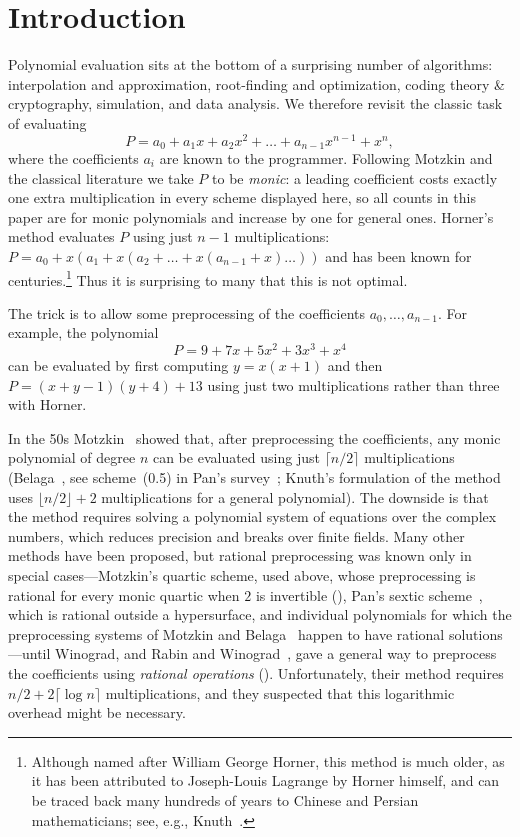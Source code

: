 \section{Introduction}

Polynomial evaluation sits at the bottom of a surprising number of algorithms:
interpolation and approximation,
root-finding and optimization,
coding theory \& cryptography,
simulation, and data analysis.
We therefore revisit the classic task of evaluating
\[
   P = a_0 + a_1 x + a_2 x^2 + \dots + a_{n-1} x^{n-1} + x^{n},
\]
where the coefficients $a_i$ are known to the programmer.
Following Motzkin and the classical literature we take $P$ to be \emph{monic}: a
leading coefficient costs exactly one extra multiplication in every scheme
displayed here, so all counts in this paper are for monic polynomials and
increase by one for general ones.
Horner's method evaluates $P$ using just $n-1$ multiplications:
$P = a_0 + x(a_1 + x(a_2 + \dots + x(a_{n-1} + x)\dots))$ and has been known for centuries.\footnote{Although named after William George Horner, this method is much older, as it has been attributed to Joseph-Louis Lagrange by Horner himself, and can be traced back many hundreds of years to Chinese and Persian mathematicians; see, e.g., Knuth~\cite[\S4.6.4]{knuth1997seminumerical}.}
Thus it is surprising to many that this is not optimal.

The trick is to allow some preprocessing of the coefficients $a_0, \dots, a_{n-1}$.
For example, the polynomial
\[
P = 9 + 7 x + 5 x^2 + 3 x^3 + x^4
\] can be evaluated by first computing
$y = x (x + 1)$ and then $P = (x + y - 1)(y + 4) + 13$ using just two multiplications rather than three with Horner.

In the 50s Motzkin~\cite{motzkin1955evaluation} showed that, after preprocessing the coefficients, any monic polynomial of degree $n$ can be evaluated using just $\lceil n/2\rceil$ multiplications (Belaga~\cite{belaga1958some}, see scheme~(0.5) in Pan's survey~\cite{pan1966methods}; Knuth's formulation of the method~\cite{knuth1997seminumerical} uses $\lfloor n/2\rfloor+2$ multiplications for a general polynomial).
The downside is that the method requires solving a polynomial system of equations over the complex numbers, which reduces precision and breaks over finite fields.
Many other methods have been proposed, but rational preprocessing was known only in special cases---Motzkin's quartic scheme, used above, whose preprocessing is rational for every monic quartic when $2$ is invertible (), Pan's sextic scheme~\cite{pan1961schemes}, which is rational outside a hypersurface, and individual polynomials for which the preprocessing systems of Motzkin and Belaga~\cite{belaga1958some} happen to have rational solutions---until Winograd, and Rabin and Winograd~\cite{rabin1972number}, gave a general way to preprocess the coefficients using \emph{rational operations} ().
Unfortunately, their method requires $n/2 + 2\lceil\log n\rceil$ multiplications, and they suspected that this logarithmic overhead might be necessary.

